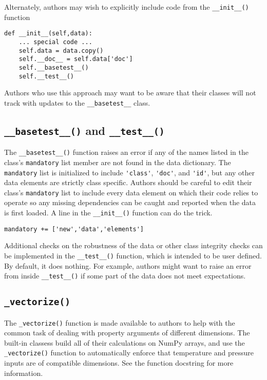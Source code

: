 Alternately, authors may wish to explicitly include code from the \verb|__init__()| function
\begin{verbatim}
def __init__(self,data):
    ... special code ...
    self.data = data.copy()
    self.__doc__ = self.data['doc']
    self.__basetest__()
    self.__test__()
\end{verbatim}
Authors who use this approach may want to be aware that their classes will not track with updates to the \verb|__basetest__| class.

\subsection{\texttt{\_\_basetest\_\_()} and \texttt{\_\_test\_\_()}}
The \verb|__basetest__()| function raises an error if any of the names listed in the class's \verb|mandatory| list member are not found in the data dictionary.  The \verb|mandatory| list is initialized to include \verb|'class'|, \verb|'doc'|, and \verb|'id'|, but any other data elements are strictly class specific.  Authors should be careful to edit their class's \verb|mandatory| list to include every data element on which their code relies to operate so any missing dependencies can be caught and reported when the data is first loaded.  A line in the \verb|__init__()| function can do the trick.
\begin{verbatim}
mandatory += ['new','data','elements']
\end{verbatim}

Additional checks on the robustness of the data or other class integrity checks can be implemented in the \verb|__test__()| function, which is intended to be user defined.  By default, it does nothing.  For example, authors might want to raise an error from inside \verb|__test__()| if some part of the data does not meet expectations.

\subsection{\texttt{\_vectorize()}}
The \verb|_vectorize()| function is made available to authors to help with the common task of dealing with property arguments of different dimensions.  The built-in classess build all of their calculations on NumPy arrays, and use the \verb|_vectorize()| function to automatically enforce that temperature and pressure inputs are of compatible dimensions.  See the function docstring for more information.

